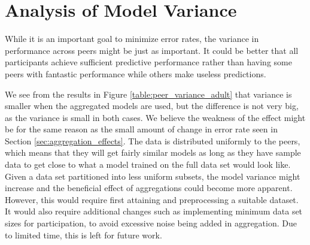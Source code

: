 \section{Analysis of Model Variance}

While it is an important goal to minimize error rates, the variance in performance across peers might be just as important. It could be better that all participants achieve sufficient predictive performance rather than having some peers with fantastic performance while others make useless predictions.
 

We see from the results in Figure \ref{table:peer_variance_adult} that variance is smaller when the aggregated models are used, but the difference is not very big, as the variance is small in both cases. We believe the weakness of the effect might be for the same reason as the small amount of change in error rate seen in Section \ref{sec:aggregation_effects}. The data is distributed uniformly to the peers, which means that they will get fairly similar models as long as they have sample data to get close to what a model trained on the full data set would look like. Given a data set partitioned into less uniform subsets, the model variance might increase and the beneficial effect of aggregations could become more apparent. However, this would require first attaining and preprocessing a suitable dataset. It would also require additional changes such as implementing minimum data set sizes for participation, to avoid excessive noise being added in aggregation. Due to limited time, this is left for future work.

